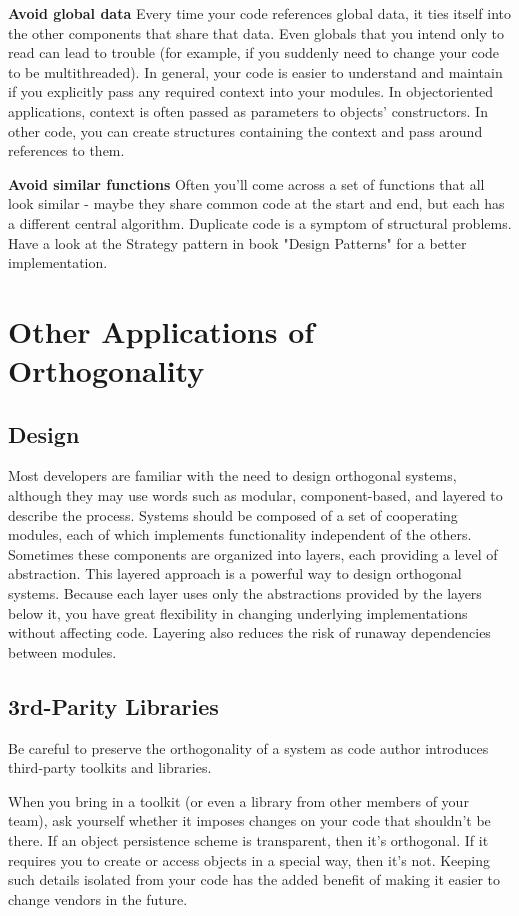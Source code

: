 \begin{item}
    \item \textbf{Avoid global data} Every time your code references global data, it ties itself into the other components that share that data. Even globals that you intend only to read can lead to trouble (for example, if you suddenly need to change your code to be multithreaded). In general, your code is easier to understand and maintain if you explicitly pass any required context into your modules. In objectoriented applications, context is often passed as parameters to objects’ constructors. In other code, you can create structures containing the context and pass around references to them.
    \item \textbf{Avoid similar functions} Often you’ll come across a set of functions that all look similar - maybe they share common code at the start and end, but each has a different central algorithm. Duplicate code is a symptom of structural problems. Have a look at the Strategy pattern in book "Design Patterns" for a better implementation.
\end{item}

\section{Other Applications of Orthogonality}

\subsection{Design}

Most developers are familiar with the need to design orthogonal systems, although they may use words such as modular, component-based, and layered to describe the process. Systems should be composed of a set of cooperating modules, each of which implements functionality independent of the others. Sometimes these components are organized into layers, each providing a level of abstraction. This layered approach is a powerful way to design orthogonal systems. Because each layer uses only the abstractions provided by the layers below it, you have great flexibility in changing underlying implementations without affecting code. Layering also reduces the risk of runaway dependencies between modules.

\subsection{3rd-Parity Libraries}

Be careful to preserve the orthogonality of a system as code author introduces third-party toolkits and libraries.

When you bring in a toolkit (or even a library from other members of your team), ask yourself whether it imposes changes on your code that shouldn’t be there. If an object persistence scheme is transparent, then it’s orthogonal. If it requires you to create or access objects in a special way, then it’s not. Keeping such details isolated from your code has the added benefit of making it easier to change vendors in the future.